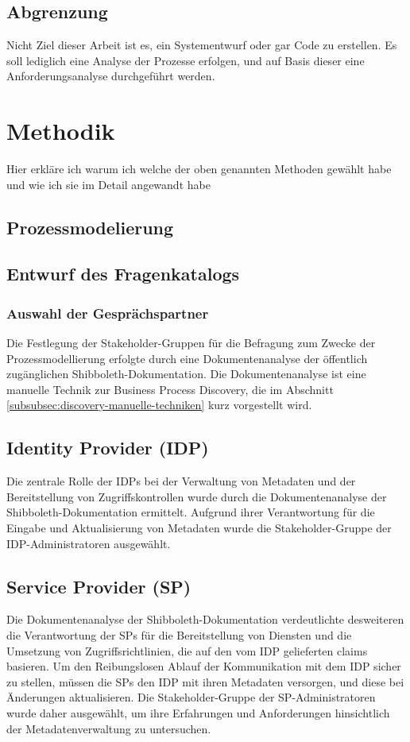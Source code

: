 \documentclass[11pt,a4paper]{scrartcl}
\begin{document}
\subsection{Abgrenzung}\label{subsec:abgrenzung}
Nicht Ziel dieser Arbeit ist es, ein Systementwurf oder gar Code zu erstellen.
Es soll lediglich eine Analyse der Prozesse erfolgen, und auf Basis dieser eine Anforderungsanalyse durchgeführt werden.




\section{Methodik}\label{sec:methodik}
Hier erkläre ich warum ich welche der oben genannten Methoden gewählt habe und wie ich sie im Detail angewandt habe
\subsection{Prozessmodelierung}\label{subsec:prozessmodelierung-methodik}
\subsection{Entwurf des Fragenkatalogs}\label{subsubsec:entwurf-fragenkatalog}
\subsubsection{Auswahl der Gesprächspartner}\label{subsubsec:auswahl-gespraechspartner}

Die Festlegung der Stakeholder-Gruppen für die Befragung zum Zwecke der Prozessmodellierung erfolgte durch eine Dokumentenanalyse der öffentlich zugänglichen Shibboleth-Dokumentation. 
Die Dokumentenanalyse ist eine manuelle Technik zur Business Process Discovery, die im Abschnitt \ref{subsubsec:discovery-manuelle-techniken} kurz vorgestellt wird. 

\subsection{Identity Provider (IDP)}
Die zentrale Rolle der IDPs bei der Verwaltung von Metadaten und der Bereitstellung von Zugriffskontrollen wurde durch die Dokumentenanalyse der Shibboleth-Dokumentation ermittelt. 
Aufgrund ihrer Verantwortung für die Eingabe und Aktualisierung von Metadaten wurde die Stakeholder-Gruppe der IDP-Administratoren ausgewählt.

\subsection{Service Provider (SP)}
Die Dokumentenanalyse der Shibboleth-Dokumentation verdeutlichte desweiteren die Verantwortung der SPs für die Bereitstellung von Diensten und die Umsetzung von Zugriffsrichtlinien, die auf den vom IDP gelieferten claims basieren.
Um den Reibungslosen Ablauf der Kommunikation mit dem IDP sicher zu stellen, müssen die SPs den IDP mit ihren Metadaten versorgen, und diese bei Änderungen aktualisieren.
Die Stakeholder-Gruppe der SP-Administratoren wurde daher ausgewählt, um ihre Erfahrungen und Anforderungen hinsichtlich der Metadatenverwaltung zu untersuchen.
\end{document}
